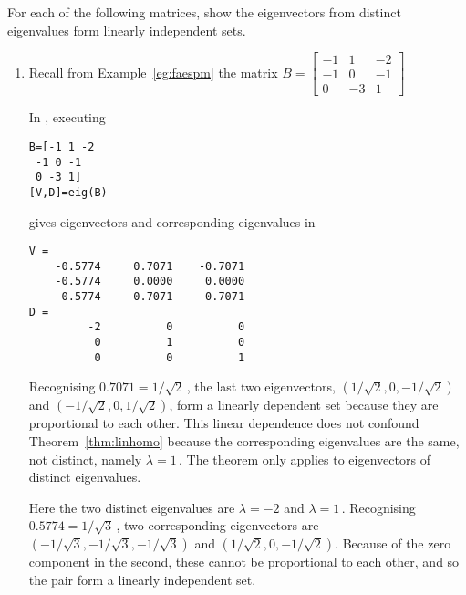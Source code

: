 \begin{example} \label{eg:indepev}
For each of the following matrices, show the eigenvectors from distinct eigenvalues form linearly independent sets.
\begin{enumerate}
\item  Recall from Example~\ref{eg:faespm} the matrix \(B=\begin{bmatrix}-1&1&-2
\\-1&0&-1
\\0&-3&1 \end{bmatrix}\)
\begin{solution} 
In \script, executing 
\begin{verbatim}
B=[-1 1 -2
 -1 0 -1
 0 -3 1]
[V,D]=eig(B)
\end{verbatim}
\setbox\ajrqrbox\hbox{}%
\marginpar{\usebox{\ajrqrbox}}%
gives eigenvectors and corresponding eigenvalues in
\begin{verbatim}
V =
    -0.5774     0.7071    -0.7071
    -0.5774     0.0000     0.0000
    -0.5774    -0.7071     0.7071
D =
         -2          0          0
          0          1          0
          0          0          1
\end{verbatim} 
Recognising \(0.7071=1/\sqrt2\)\,, the last two eigenvectors, \((1/\sqrt2,0,-1/\sqrt2)\) and  \((-1/\sqrt2,0,1/\sqrt2)\), form a linearly dependent set because they are proportional to each other.
This linear dependence does not confound  Theorem~\ref{thm:linhomo} because the corresponding eigenvalues are the same, not distinct, namely \(\lambda=1\)\,.
The theorem only applies to eigenvectors of distinct eigenvalues.

Here the two distinct eigenvalues are \(\lambda=-2\) and \(\lambda=1\)\,.
Recognising \(0.5774=1/\sqrt3\)\,, two corresponding eigenvectors are \((-1/\sqrt3,-1/\sqrt3,-1/\sqrt3)\) and \((1/\sqrt2,0,-1/\sqrt2)\).
Because of the zero component in the second, these cannot be proportional to each other, and so the pair form a linearly independent set.
\end{solution}



\end{enumerate}
\end{example}
